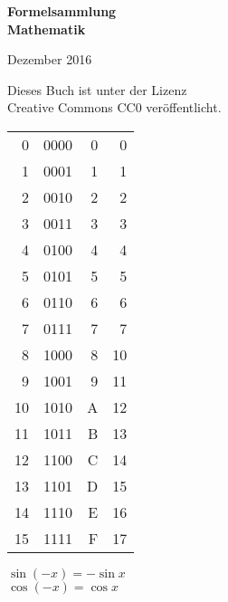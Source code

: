 \documentclass[a4paper,10pt,fleqn,twocolumn,twoside,openany]{book}
\numberwithin{equation}{chapter}
\newenvironment{ttsection}{\ttfamily}{\par}
\begin{document}
\setlength{\abovedisplayskip}{6pt}
\setlength{\belowdisplayskip}{6pt}
\setlength{\abovedisplayshortskip}{6pt}
\setlength{\belowdisplayshortskip}{6pt}

\begin{titlepage}
\centering
\phantom{x}

\vspace{20em}
{\noindent\Huge\sffamily\textbf{Formelsammlung\\
Mathematik}}

\vspace{2em}
{\Large Dezember 2016}\\
\end{titlepage}

\thispagestyle{empty}

\noindent
Dieses Buch ist unter der Lizenz\\
Creative Commons CC0 veröffentlicht.
\vspace{8em}

\noindent
\begin{ttsection}
\begin{tabular}{r|r|r|r}
 0 & 0000 & 0 &  0\\
 1 & 0001 & 1 &  1\\
 2 & 0010 & 2 &  2\\
 3 & 0011 & 3 &  3\\
\noalign{\vspace{1em}}
 4 & 0100 & 4 &  4\\
 5 & 0101 & 5 &  5\\
 6 & 0110 & 6 &  6\\
 7 & 0111 & 7 &  7\\
\noalign{\vspace{1em}}
 8 & 1000 & 8 & 10\\
 9 & 1001 & 9 & 11\\
10 & 1010 & A & 12\\
11 & 1011 & B & 13\\
\noalign{\vspace{1em}}
12 & 1100 & C & 14\\
13 & 1101 & D & 15\\
14 & 1110 & E & 16\\
15 & 1111 & F & 17
\end{tabular}
\end{ttsection}

\newpage
\noindent
$\sin(-x) = -\sin x$\\
$\cos(-x) = \cos x$
\vspace{1em}
\end{document}
